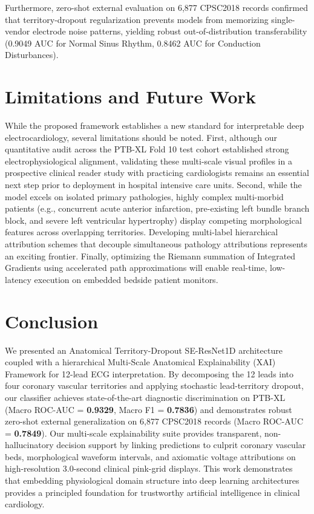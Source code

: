 \documentclass[12pt]{elsarticle}
\begin{document}
Furthermore, zero-shot external evaluation on 6,877 CPSC2018 records confirmed that territory-dropout regularization prevents models from memorizing single-vendor electrode noise patterns, yielding robust out-of-distribution transferability (0.9049 AUC for Normal Sinus Rhythm, 0.8462 AUC for Conduction Disturbances).

\section{Limitations and Future Work}
\label{sec:limitations}
While the proposed framework establishes a new standard for interpretable deep electrocardiology, several limitations should be noted. First, although our quantitative audit across the PTB-XL Fold 10 test cohort established strong electrophysiological alignment, validating these multi-scale visual profiles in a prospective clinical reader study with practicing cardiologists remains an essential next step prior to deployment in hospital intensive care units. Second, while the model excels on isolated primary pathologies, highly complex multi-morbid patients (e.g., concurrent acute anterior infarction, pre-existing left bundle branch block, and severe left ventricular hypertrophy) display competing morphological features across overlapping territories. Developing multi-label hierarchical attribution schemes that decouple simultaneous pathology attributions represents an exciting frontier. Finally, optimizing the Riemann summation of Integrated Gradients using accelerated path approximations will enable real-time, low-latency execution on embedded bedside patient monitors.

\section{Conclusion}
\label{sec:conclusion}
We presented an Anatomical Territory-Dropout SE-ResNet1D architecture coupled with a hierarchical Multi-Scale Anatomical Explainability (XAI) Framework for 12-lead ECG interpretation. By decomposing the 12 leads into four coronary vascular territories and applying stochastic lead-territory dropout, our classifier achieves state-of-the-art diagnostic discrimination on PTB-XL (Macro ROC-AUC = \textbf{0.9329}, Macro F1 = \textbf{0.7836}) and demonstrates robust zero-shot external generalization on 6,877 CPSC2018 records (Macro ROC-AUC = \textbf{0.7849}). Our multi-scale explainability suite provides transparent, non-hallucinatory decision support by linking predictions to culprit coronary vascular beds, morphological waveform intervals, and axiomatic voltage attributions on high-resolution 3.0-second clinical pink-grid displays. This work demonstrates that embedding physiological domain structure into deep learning architectures provides a principled foundation for trustworthy artificial intelligence in clinical cardiology.
\end{document}

